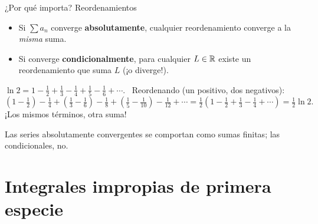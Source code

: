 \documentclass[10pt,aspectratio=169]{beamer}
\begin{document}
\begin{frame}{¿Por qué importa? Reordenamientos}
  \begin{teorema}
    \begin{itemize}
      \item Si $\sum a_n$ converge \textbf{absolutamente}, cualquier reordenamiento converge a la \emph{misma} suma.
      \item Si converge \textbf{condicionalmente}, para cualquier $L\in\mathbb{R}$ existe un reordenamiento que suma $L$ (¡o diverge!).
    \end{itemize}
  \end{teorema}
  \begin{ejemplo}
    $\ln2=1-\frac12+\frac13-\frac14+\frac15-\frac16+\cdots$. \ Reordenando (un positivo, dos negativos):
    \[ \left(1-\tfrac12\right)-\tfrac14+\left(\tfrac13-\tfrac16\right)-\tfrac18+\left(\tfrac15-\tfrac1{10}\right)-\tfrac1{12}+\cdots
       =\tfrac12\left(1-\tfrac12+\tfrac13-\tfrac14+\cdots\right)=\tfrac12\ln2. \]
    ¡Los mismos términos, otra suma!
  \end{ejemplo}
  \begin{idea}
    Las series absolutamente convergentes se comportan como sumas finitas; las condicionales, no.
  \end{idea}
\end{frame}

\section{Integrales impropias de primera especie}
\end{document}
